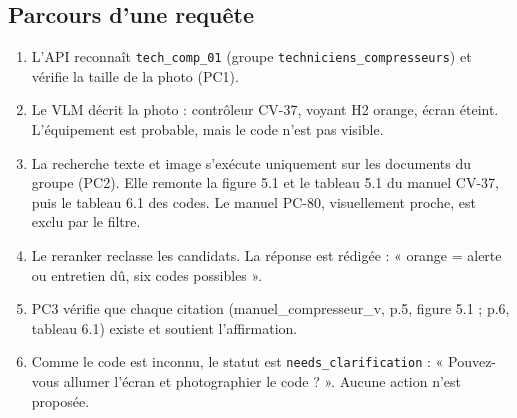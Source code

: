 \documentclass[11pt,a4paper]{article}
\begin{document}
\subsection{Parcours d'une requête}
\begin{idee}
\begin{enumerate}
\item L'API reconnaît \texttt{tech\_comp\_01} (groupe \texttt{techniciens\_compresseurs}) et vérifie la taille de la photo (PC1).
\item Le VLM décrit la photo : contrôleur CV-37, voyant H2 orange, écran éteint. L'équipement est probable, mais le code n'est pas visible.
\item La recherche texte et image s'exécute uniquement sur les documents du groupe (PC2). Elle remonte la figure 5.1 et le tableau 5.1 du manuel CV-37, puis le tableau 6.1 des codes. Le manuel PC-80, visuellement proche, est exclu par le filtre.
\item Le reranker reclasse les candidats. La réponse est rédigée : « orange = alerte ou entretien dû, six codes possibles ».
\item PC3 vérifie que chaque citation (manuel\_compresseur\_v, p.5, figure 5.1 ; p.6, tableau 6.1) existe et soutient l'affirmation.
\item Comme le code est inconnu, le statut est \texttt{needs\_clarification} : « Pouvez-vous allumer l'écran et photographier le code ? ». Aucune action n'est proposée.
\end{enumerate}
\end{idee}
\end{document}
